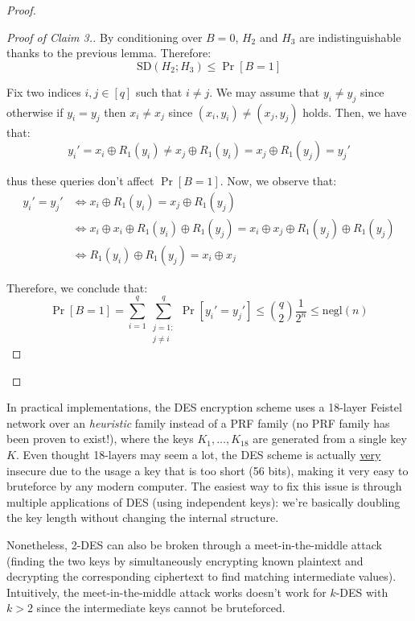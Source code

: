 \documentclass[a4paper, 12pt]{report}
\begin{document}
\begin{proof}
\begin{proof}[Proof of Claim 3.]
            By conditioning over $B = 0$, $H_2$ and $H_3$ are indistinguishable thanks to the previous lemma. Therefore:
            \[\mathrm{SD}(H_2; H_3) \leq \Pr[B = 1]\]

            Fix two indices $i,j \in [q]$ such that $i \neq j$. We may assume that $y_i \neq y_j$ since otherwise if $y_i = y_j$ then $x_i \neq x_j$ since $(x_i, y_i) \neq (x_j, y_j)$ holds. Then, we have that:
            \[y_i' = x_i \oplus R_1(y_i) \neq x_j \oplus R_1(y_i) = x_j \oplus R_1(y_j) = y_j'\]

            thus these queries don't affect $\Pr[B = 1]$. Now, we observe that:
            \[\begin{split}
                y_i' = y_j' &\iff x_i \oplus R_1(y_i) = x_j \oplus R_1(y_j) \\
                &\iff x_i \oplus x_i \oplus R_1(y_i) \oplus R_1(y_j) = x_i \oplus x_j \oplus R_1(y_j) \oplus R_1(y_j)\\
                &\iff R_1(y_i) \oplus R_1(y_j) = x_i \oplus x_j
            \end{split}\]

            Therefore, we conclude that:
            \[\Pr[B = 1] = \sum_{i = 1}^{q} \sum_{\substack{j = 1 :\\ j \neq i}}^{q} \Pr[y_i' = y_j'] \leq \binom{q}{2} \frac{1}{2^n} \leq \mathrm{negl}(n)\]
        \end{proof}
    \end{proof}

    In practical implementations, the DES encryption scheme uses a 18-layer Feistel network over an \textit{heuristic} family instead of a PRF family (no PRF family has been proven to exist!), where the keys $K_1, \ldots, K_{18}$ are generated from a single key $K$. Even thought 18-layers may seem a lot, the DES scheme is actually \underline{very} insecure due to the usage a key that is too short (56 bits), making it very easy to bruteforce by any modern computer. The easiest way to fix this issue is through multiple applications of DES (using independent keys): we're basically doubling the key length without changing the internal structure.
    
    Nonetheless, 2-DES can also be broken through a meet-in-the-middle attack (finding the two keys by simultaneously encrypting known plaintext and decrypting the corresponding ciphertext to find matching intermediate values). Intuitively, the meet-in-the-middle attack works doesn't work for $k$-DES with $k > 2$ since the intermediate keys cannot be bruteforced.
    
\end{document}

